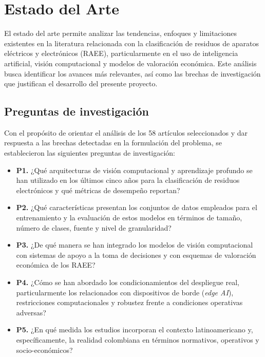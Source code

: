 \chapter{Estado del Arte}

El estado del arte permite analizar las tendencias, enfoques y limitaciones existentes en la literatura relacionada con la clasificación de residuos de aparatos eléctricos y electrónicos (RAEE), particularmente en el uso de inteligencia artificial, visión computacional y modelos de valoración económica. Este análisis busca identificar los avances más relevantes, así como las brechas de investigación que justifican el desarrollo del presente proyecto.

\section{Preguntas de investigación}

Con el propósito de orientar el análisis de los 58 artículos seleccionados y dar respuesta a las brechas detectadas en la formulación del problema, se establecieron las siguientes preguntas de investigación:

\begin{itemize}
    \item \textbf{P1.} ¿Qué arquitecturas de visión computacional y aprendizaje profundo se han utilizado en los últimos cinco años para la clasificación de residuos electrónicos y qué métricas de desempeño reportan?
    \item \textbf{P2.} ¿Qué características presentan los conjuntos de datos empleados para el entrenamiento y la evaluación de estos modelos en términos de tamaño, número de clases, fuente y nivel de granularidad?
    \item \textbf{P3.} ¿De qué manera se han integrado los modelos de visión computacional con sistemas de apoyo a la toma de decisiones y con esquemas de valoración económica de los RAEE?
    \item \textbf{P4.} ¿Cómo se han abordado los condicionamientos del despliegue real, particularmente los relacionados con dispositivos de borde (\textit{edge AI}), restricciones computacionales y robustez frente a condiciones operativas adversas?
    \item \textbf{P5.} ¿En qué medida los estudios incorporan el contexto latinoamericano y, específicamente, la realidad colombiana en términos normativos, operativos y socio-económicos?
\end{itemize}

